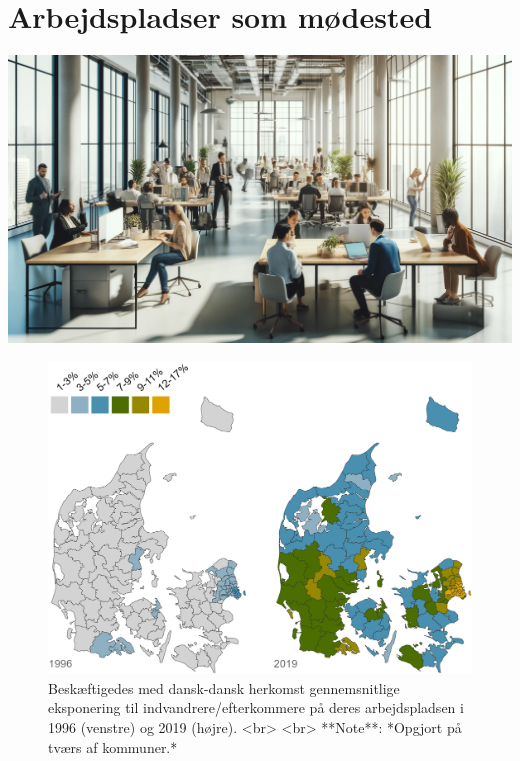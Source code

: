 \documentclass[
]{book}
\begin{document}
\chapter{Arbejdspladser som mødested}\label{kap4}

\includegraphics[width=1\linewidth]{images/dalle-work}

\begin{figure}
\includegraphics[width=1\linewidth]{images/Figur_4_1} \caption{Beskæftigedes med dansk-dansk herkomst gennemsnitlige eksponering til indvandrere/efterkommere på deres arbejdspladsen i 1996 (venstre) og 2019 (højre). <br> <br> **Note**: *Opgjort på tværs af kommuner.*}\label{fig:fig-4-1}
\end{figure}
\end{document}
